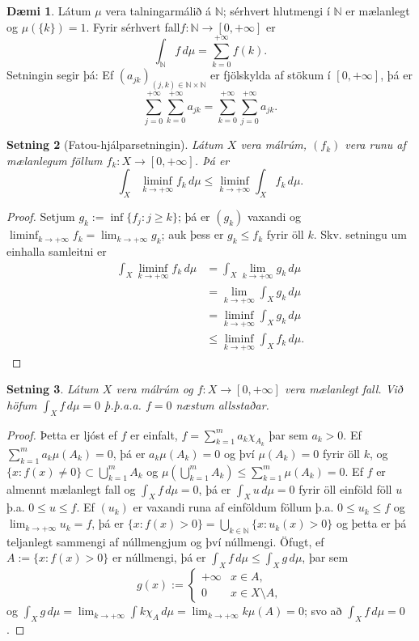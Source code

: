 \documentclass[a4paper,icelandic,11pt]{book}
\theoremstyle{plain}      \newtheorem{setn}{Setning}[chapter]
\theoremstyle{definition} \newtheorem{skilgr}[setn]{Skilgreining}
\newtheorem{daemi}[setn]{Dæmi}
\theoremstyle{remark}     \newtheorem*{ath}{Athugasemd}
\newcommand{\N}{\mathbb N}
\begin{document}
\begin{daemi}
  Látum $\mu$ vera talningarmálið á $\N$; sérhvert hlutmengi í $\N$ er
  mælanlegt og $\mu(\{k\})=1$. Fyrir sérhvert fall$f:\N\to[0,+\infty]$
  er
  \[
  \int_{\N}f\,d\mu = \sum_{k=0}^{+\infty}f(k).
  \]
  Setningin segir þá: Ef $(a_{jk})_{(j,k)\in\N\times\N}$ er fjölskylda
  af stökum í $[0,+\infty]$, þá er
  \[
  \sum_{j=0}^{+\infty}\sum_{k=0}^{+\infty}a_{jk}
  = \sum_{k=0}^{+\infty}\sum_{j=0}^{+\infty}a_{jk}.
   \]
 \end{daemi}
 \begin{setn}
   [Fatou-hjálparsetningin]
   Látum $X$ vera málrúm, $(f_{k})$ vera runu af mælanlegum föllum
   $f_{k}:X\to[0,+\infty]$. Þá er
   \[
   \int_{X}\liminf_{k\to+\infty}f_{k}\,d\mu
   \le \liminf_{k\to+\infty}\int_{X}f_{k}\,d\mu.
   \]
 \end{setn}
 \begin{proof}
   Setjum $g_{k}:=\inf\{f_{j}:j\ge k\}$; þá er $(g_{k})$ vaxandi og
   $\liminf_{k\to+\infty}f_{k}=\lim_{k\to+\infty}g_{k}$; auk þess er
   $g_{k}\le f_{k}$ fyrir öll $k$. Skv. setningu um einhalla samleitni
   er
   \begin{align*}
     \int_{X}\liminf_{k\to+\infty}f_{k}\,d\mu
     &= \int_{X}\lim_{k\to+\infty}g_{k}\,d\mu
     \\
     &= \lim_{k\to+\infty}\int_{X}g_{k}\,d\mu
     \\
     &= \liminf_{k\to+\infty}\int_{X}g_{k}\,d\mu
     \\
     &\le\liminf_{k\to+\infty}\int_{X}f_{k}\,d\mu.
   \end{align*}
 \end{proof}
 \begin{setn}
   Látum $X$ vera málrúm og $f:X\to[0,+\infty]$ vera mælanlegt
   fall. Við höfum $\int_{X}f\,d\mu=0$ þ.þ.a.a. $f=0$ næstum
   allsstaðar.
 \end{setn}
 \begin{proof}
   Þetta er ljóst ef $f$ er einfalt,
   $f=\sum_{k=1}^{m}a_{k}\chi_{A_{k}}$ þar sem $a_{k}>0$. Ef
   $\sum_{k=1}^{m}a_{k}\mu(A_{k})=0$, þá er $a_{k}\mu(A_{k})=0$ og því
   $\mu(A_{k})=0$ fyrir öll $k$, og
   $\{x:f(x)\ne0\}\subset\bigcup_{k=1}^{m}A_{k}$ og
   $\mu(\bigcup_{k=1}^{m}A_{k})\le\sum_{k=1}^{m}\mu(A_{k})=0$. Ef $f$
   er almennt mælanlegt fall og $\int_{X}f\,d\mu=0$, þá er
   $\int_{X}u\,d\mu=0$ fyrir öll einföld föll $u$
   þ.a. $0\le{u}\le{f}$. Ef $(u_{k})$ er vaxandi runa af einföldum
   föllum þ.a. $0\le{u_{k}}\le f$ og $\lim_{k\to+\infty}u_{k}=f$, þá
   er $\{x:f(x)>0\}=\bigcup_{k\in\N}\{x:u_{k}(x)>0\}$ og þetta er þá
   teljanlegt sammengi af núllmengjum og því núllmengi. Öfugt, ef
   $A:=\{x:f(x)>0\}$ er núllmengi, þá er
   $\int_{X}f\,d\mu\le\int_{X}g\,d\mu$, þar sem
   \[
   g(x) :=
   \begin{cases}
     +\infty & x\in A,\\
     0       & x\in X\setminus A,
   \end{cases}
   \]
   og
   $\int_{X}g\,d\mu=\lim_{k\to+\infty}\int{k}\chi_{A}\,d\mu=\lim_{k\to+\infty}k\mu(A)=0$;
   svo að $\int_{X}f\,d\mu=0$.
 \end{proof}
\end{document}
